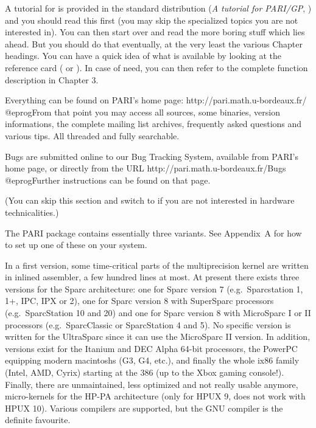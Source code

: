  A tutorial for  is provided in the
standard distribution (\emph{A tutorial for PARI/GP}, ) and
you should read this first (you may skip the specialized topics you are not
interested in). You can then start over and read the more boring stuff which
lies ahead. But you should do that eventually, at the very least the various
Chapter headings. You can have a quick idea of what is available by looking
at the  reference card ( or ). In
case of need, you can then refer to the complete function description in
Chapter 3.

 Everything can be found on
PARI's home page:
\bprog
  http://pari.math.u-bordeaux.fr/
@eprog\noindent From that point you may access all sources, some binaries,
version informations, the complete mailing list archives, frequently asked
questions and various tips. All threaded and fully searchable.

 Bugs are submitted online to our Bug
Tracking System, available from PARI's home page, or directly from the URL
\bprog
  http://pari.math.u-bordeaux.fr/Bugs
@eprog\noindent Further instructions can be found on that page.

 (You can skip this section and switch to
 if you are not interested in hardware technicalities.)

The PARI package contains essentially three variants. See Appendix~A for how
to set up one of these on your system.

In a first version, some time-critical parts of the multiprecision kernel are
written in inlined assembler, a few hundred lines at most. At present there
exists three versions for the Sparc architecture: one for Sparc version 7
(e.g.~Sparcstation 1, 1+, IPC, IPX or 2), one for Sparc version 8 with
SuperSparc processors (e.g.~SparcStation 10 and 20) and one for Sparc version
8 with MicroSparc I or II processors (e.g.~SparcClassic or SparcStation 4 and
5). No specific version is written for the UltraSparc since it can use the
MicroSparc II version. In addition, versions exist for the Itanium and DEC
Alpha 64-bit processors, the PowerPC equipping modern macintoshs (G3, G4,
etc.), and finally the whole ix86 family (Intel, AMD, Cyrix) starting at the
386 (up to the Xbox gaming console!). Finally, there are unmaintained, less
optimized and not really usable anymore, micro-kernels for the HP-PA
architecture (only for HPUX 9, does not work with HPUX 10). Various compilers
are supported, but the GNU  compiler is the definite favourite.

